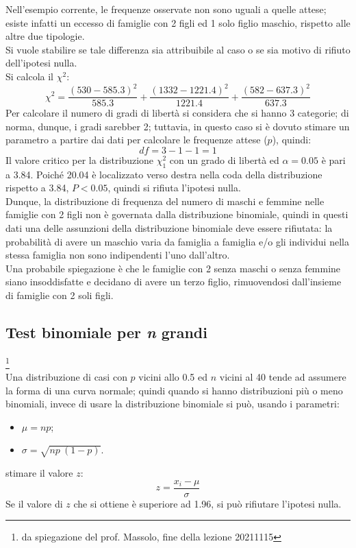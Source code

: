 \documentclass[10pt, draft]{book}
\newcommand{\tightlist}{%
\setlength{\itemsep}{1pt}\setlength{\parskip}{0pt}\setlength{\parsep}{0pt}}
\newcounter{example}[section]
\begin{document}
\begin{example}
\begin{figure}[H]
    \caption{\small{}}
    \end{figure}
    Nell'esempio corrente, le frequenze osservate non sono uguali a quelle attese; esiste infatti un eccesso di famiglie con 2 figli ed 1 solo figlio maschio, rispetto alle altre due tipologie.
    \\
    Si vuole stabilire se tale differenza sia attribuibile al caso o se sia motivo di rifiuto dell'ipotesi nulla.
    \\
    Si calcola il $\chi^2$:
    \begin{equation}
    \chi^2 = \frac{(530-585.3)^2}{585.3}+\frac{(1332-1221.4)^2}{1221.4}+\frac{(582-637.3)^2}{637.3}
    \end{equation}
    Per calcolare il numero di gradi di libertà si considera che si hanno 3 categorie; di norma, dunque, i gradi sarebber 2; tuttavia, in questo caso si è dovuto stimare un parametro a partire dai dati per calcolare le frequenze attese ($p$), quindi:
    \begin{equation}
    df = 3-1-1 = 1
    \end{equation}
    Il valore critico per la distribuzione $\chi^2_1$ con un grado di libertà ed $\alpha= 0.05$ è pari a 3.84. Poiché 20.04 è localizzato verso destra nella coda della distribuzione rispetto a 3.84, $P < 0.05$, quindi si rifiuta l'ipotesi nulla.
    \\
    Dunque, la distribuzione di frequenza del numero di maschi e femmine nelle famiglie con 2 figli non è governata dalla distribuzione binomiale, quindi in questi dati una delle assunzioni della distribuzione binomiale deve essere rifiutata: la probabilità di avere un maschio varia da famiglia a famiglia e/o gli individui nella stessa famiglia non sono indipendenti l'uno dall'altro.
    \\
    Una probabile spiegazione è che le famiglie con 2 senza maschi o senza femmine siano insoddisfatte e decidano di avere un terzo figlio, rimuovendosi dall'insieme di famiglie con 2 soli figli.
\end{example}

\subsection{Test binomiale per \textit{n} grandi}\footnote{da spiegazione del prof. Massolo, fine della lezione 20211115}
\\
Una distribuzione di casi con $p$ vicini allo 0.5 ed $n$ vicini al 40 tende ad assumere la forma di una curva normale; quindi quando si hanno distribuzioni più o meno binomiali, invece di usare la distribuzione binomiale si può, usando i parametri:
\begin{itemize} \tightlist
    \item $\mu = np$;
    \item $\sigma = \sqrt{np\ (1-p)}$.
\end{itemize}
stimare il valore $z$:
\begin{equation}
z = \frac{x_i-\mu}{\sigma}
\end{equation}
Se il valore di $z$ che si ottiene è superiore ad 1.96, si può rifiutare l'ipotesi nulla.
\end{document}
